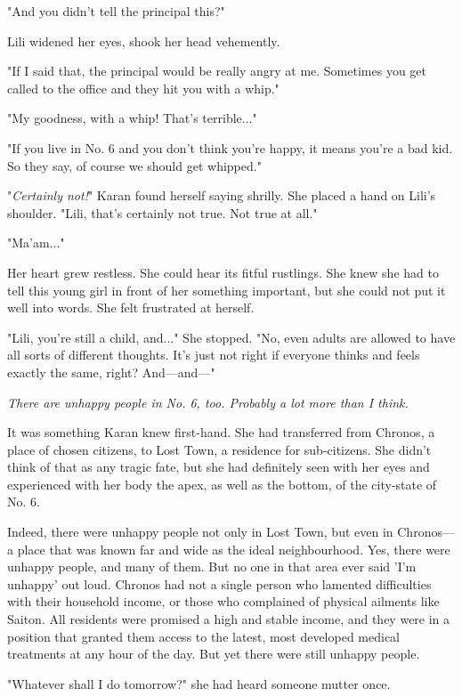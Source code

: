"And you didn't tell the principal this?"

Lili widened her eyes, shook her head vehemently.

"If I said that, the principal would be really angry at me. Sometimes
you get called to the office and they hit you with a whip."

"My goodness, with a whip! That's terrible..."

"If you live in No. 6 and you don't think you're happy, it means you're
a bad kid. So they say, of course we should get whipped."

"\emph{Certainly not!}" Karan found herself saying shrilly. She placed a hand
on Lili's shoulder. "Lili, that's certainly not true. Not true at all."

"Ma'am..."

Her heart grew restless. She could hear its fitful rustlings. She knew
she had to tell this young girl in front of her something important, but
she could not put it well into words. She felt frustrated at herself.

"Lili, you're still a child, and..." She stopped. "No, even adults are
allowed to have all sorts of different thoughts. It's just not right if
everyone thinks and feels exactly the same, right? And---and---"

\emph{There are unhappy people in No. 6, too. Probably a lot more than I
think.}

It was something Karan knew first-hand. She had transferred from
Chronos, a place of chosen citizens, to Lost Town, a residence for
sub-citizens. She didn't think of that as any tragic fate, but she had
definitely seen with her eyes and experienced with her body the apex, as
well as the bottom, of the city-state of No. 6.

Indeed, there were unhappy people not only in Lost Town, but even in
Chronos---a place that was known far and wide as the ideal neighbourhood.
Yes, there were unhappy people, and many of them. But no one in that
area ever said 'I'm unhappy' out loud. Chronos had not a single person
who lamented difficulties with their household income, or those who
complained of physical ailments like Saiton. All residents were promised
a high and stable income, and they were in a position that granted them
access to the latest, most developed medical treatments at any hour of
the day. But yet there were still unhappy people.

"Whatever shall I do tomorrow?" she had heard someone mutter once.


